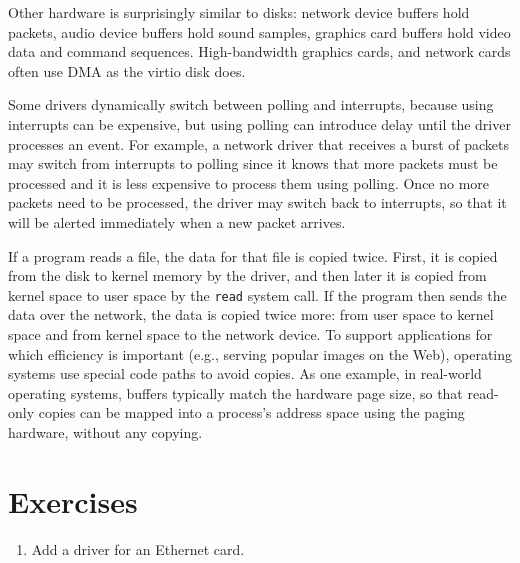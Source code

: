 Other hardware is surprisingly similar to disks: network device
buffers hold packets, audio device buffers hold sound samples,
graphics card buffers hold video data and command sequences.
High-bandwidth graphics cards, and network cards often use DMA
as the virtio disk does.

Some drivers dynamically switch between polling and interrupts, because using
interrupts can be expensive, but using polling can introduce delay until the
driver processes an event.  For example, a network driver that receives a
burst of packets may switch from interrupts to polling since it knows that more
packets must be processed and it is less expensive to process them using polling.
Once no more packets need to be processed, the driver may switch back to
interrupts, so that it will be alerted immediately when a new packet arrives.

If a program reads a file, the data for that file is copied twice.  First, it
is copied from the disk to kernel memory by the driver, and then later it is
copied from kernel space to user space by the 
\lstinline{read}
system call.  If the program then sends the data over the network, 
the data is copied twice more: from user space to kernel space and from
kernel space to the network device.  To support applications for which 
efficiency is important (e.g., serving popular images on the Web), operating systems
use special code paths to avoid copies.  As one example,
in real-world operating systems, 
buffers typically match the hardware page size, so that
read-only copies can be mapped into a process's address space
using the paging hardware, without any copying.

\section{Exercises}

\begin{enumerate}
  
\item Add a driver for an Ethernet card.

\end{enumerate}
